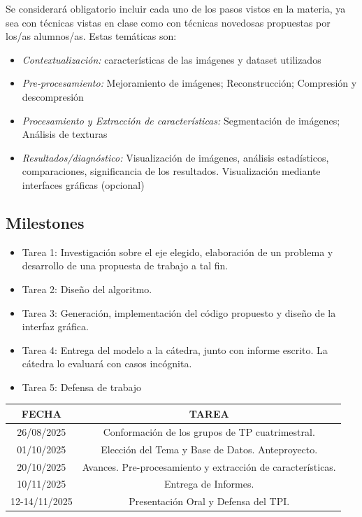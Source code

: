 \documentclass[10pt]{article}
\begin{document}
Se considerará obligatorio incluir cada uno de los pasos vistos en la materia, ya sea con técnicas vistas en clase como con técnicas novedosas propuestas por los/as alumnos/as. Estas temáticas son:
\begin{itemize}
    \item \textit{Contextualización:} características de las imágenes y dataset utilizados
    \item \textit{Pre-procesamiento:} Mejoramiento de imágenes; Reconstrucción; Compresión y descompresión
    \item \textit{Procesamiento y Extracción de características:} Segmentación de imágenes; Análisis de texturas
    \item \textit{Resultados/diagnóstico:} Visualización de imágenes, análisis estadísticos, comparaciones, significancia de los resultados. Visualización mediante interfaces gráficas (opcional)
\end{itemize}

\subsection*{Milestones}

\begin{itemize}
    \item Tarea 1: Investigación sobre el eje elegido, elaboración de un problema y desarrollo de una propuesta de trabajo a tal fin.
    \item Tarea 2: Diseño del algoritmo.
    \item Tarea 3: Generación, implementación del código propuesto y diseño de la interfaz gráfica.
    \item Tarea 4: Entrega del modelo a la cátedra, junto con informe escrito. La cátedra lo evaluará con casos incógnita.
    \item Tarea 5: Defensa de trabajo

\end{itemize}

\begin{table}[h]
\begin{tabular}{|c|c|}
\hline
\textbf{FECHA} & \textbf{TAREA} \\ \hline
26/08/2025 & Conformación de los grupos de TP cuatrimestral. \\ \hline
01/10/2025 & Elección del Tema y Base de Datos. Anteproyecto. \\ \hline
20/10/2025 & Avances. Pre-procesamiento y extracción de características. \\ \hline
10/11/2025 & Entrega de Informes. \\ \hline
12-14/11/2025 & Presentación Oral y Defensa del TPI. \\ \hline
\end{tabular}
\end{table}
\end{document}
